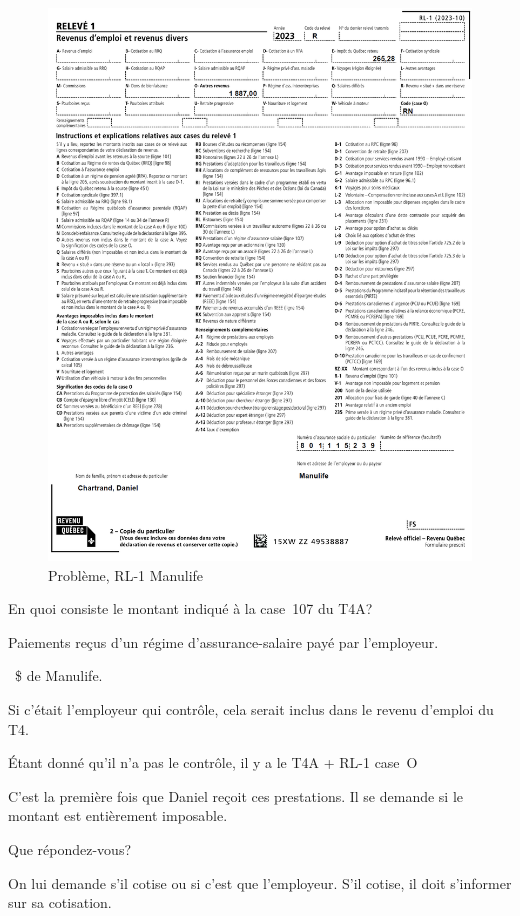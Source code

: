 \begin{figure}
	\centering
	\includegraphics[width=.9\textwidth]{probleme/chapitre-2/RL1-Manulife.png}
	\caption{Problème, RL-1 Manulife}
	\label{fig:Chap2RL1Manulife}
\end{figure}


\setcounter{question}{0}
\begin{question}
	En quoi consiste le montant indiqué à la case~107 du T4A?
\end{question}
Paiements reçus d'un régime d'assurance-salaire payé par l'employeur.

~\$ de Manulife.

Si c'était l'employeur qui contrôle, cela serait inclus dans le revenu d'emploi du T4.

Étant donné qu'il n'a pas le contrôle, il y a le T4A + RL-1 case~O

\begin{question}
	C'est la première fois que Daniel reçoit ces prestations. Il se demande si le montant est entièrement imposable. 
	
	Que répondez-vous?
\end{question}
On lui demande s'il cotise ou si c'est que l'employeur. S'il cotise, il doit s'informer sur sa cotisation.

